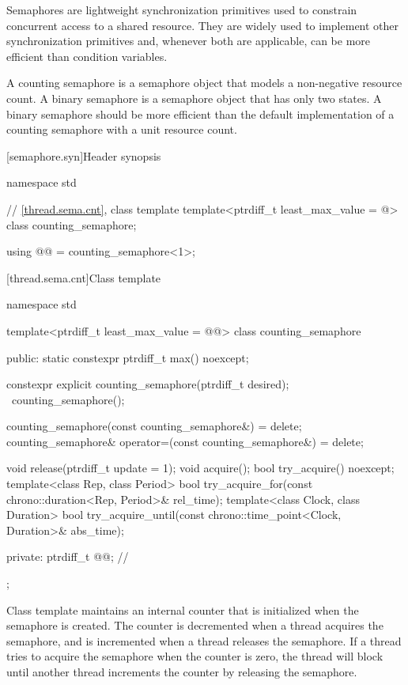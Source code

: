 \pnum
Semaphores are lightweight synchronization primitives
used to constrain concurrent access to a shared resource.
They are widely used to implement other synchronization primitives and,
whenever both are applicable, can be more efficient than condition variables.

\pnum
A counting semaphore is a semaphore object
that models a non-negative resource count.
A binary semaphore is a semaphore object that has only two states.
A binary semaphore should be more efficient than
the default implementation of a counting semaphore with a unit resource count.

[semaphore.syn]{Header  synopsis}

%
\begin{codeblock}
namespace std {
  // \ref{thread.sema.cnt}, class template 
  template<ptrdiff_t least_max_value = @\impdef@>
    class counting_semaphore;

  using @@ = counting_semaphore<1>;
}
\end{codeblock}

[thread.sema.cnt]{Class template }

\begin{codeblock}
namespace std {
  template<ptrdiff_t least_max_value = @@>
  class counting_semaphore {
  public:
    static constexpr ptrdiff_t max() noexcept;

    constexpr explicit counting_semaphore(ptrdiff_t desired);
    ~counting_semaphore();

    counting_semaphore(const counting_semaphore&) = delete;
    counting_semaphore& operator=(const counting_semaphore&) = delete;

    void release(ptrdiff_t update = 1);
    void acquire();
    bool try_acquire() noexcept;
    template<class Rep, class Period>
      bool try_acquire_for(const chrono::duration<Rep, Period>& rel_time);
    template<class Clock, class Duration>
      bool try_acquire_until(const chrono::time_point<Clock, Duration>& abs_time);

  private:
    ptrdiff_t @@;          // \expos
  };
}
\end{codeblock}

\pnum
{}%
Class template  maintains an internal counter
that is initialized when the semaphore is created.
The counter is decremented when a thread acquires the semaphore, and
is incremented when a thread releases the semaphore.
If a thread tries to acquire the semaphore when the counter is zero,
the thread will block
until another thread increments the counter by releasing the semaphore.

